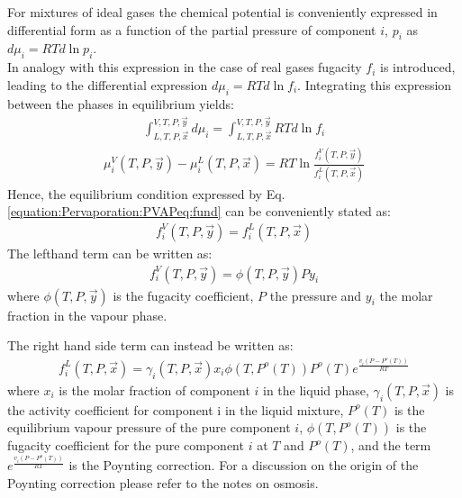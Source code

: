 \documentclass[letterpaper,10pt,english]{jupyterBook}
\begin{document}
\sphinxAtStartPar
For mixtures of ideal gases the chemical potential is conveniently expressed in differential form as a function of the partial pressure of component \(i\), \(p_i\) as \(d\mu_i=RTd\ln{p_i}\).\\
In analogy with this expression in the case of real gases fugacity \(f_i\) is introduced, leading to the differential expression \(d\mu_i=RTd\ln{f_i}\).
Integrating this expression between the phases in equilibrium yields:
\begin{equation*}
\begin{split}
\int_{L,T,P,\vec{x}}^{V,T,P,\vec{y}}d\mu_i=\int_{L,T,P,\vec{x}}^{V,T,P,\vec{y}}RTd\ln{f_i}
\end{split}
\end{equation*}\begin{equation}\label{equation:Pervaporation:PVAPeq:chempot}
\begin{split}
\mu_i^V(T,P,\vec{y})-\mu_i^L(T,P,\vec{x})=RT\ln\frac{f_i^V(T,P,\vec{y})}{f_i^L(T,P,\vec{x})}
\end{split}
\end{equation}
\sphinxAtStartPar
Hence, the equilibrium condition expressed by Eq. \eqref{equation:Pervaporation:PVAPeq:fund} can be conveniently stated as:
\begin{equation}\label{equation:Pervaporation:PVAPeq:EQUI}
\begin{split}
f_i^V(T,P,\vec{y})=f_i^L(T,P,\vec{x})
\end{split}
\end{equation}
\sphinxAtStartPar
The left\sphinxhyphen{}hand term can be written as:
\begin{equation}\label{equation:Pervaporation:PVAPeq:vapour}
\begin{split}
f_i^V(T,P,\vec{y})=\phi(T,P,\vec{y})Py_i
\end{split}
\end{equation}
\sphinxAtStartPar
where \(\phi(T,P,\vec{y})\) is the fugacity coefficient, \(P\) the pressure and \(y_i\) the molar fraction in the vapour phase.

\sphinxAtStartPar
The right hand side term can instead be written as:
\begin{equation}\label{equation:Pervaporation:PVAPeq:liquid}
\begin{split}
f_i^L(T,P,\vec{x})=\gamma_i(T,P,\vec{x})x_i\phi(T,P^o(T))P^o(T)e^{\frac{v_i(P-P^o(T))}{RT}}
\end{split}
\end{equation}
\sphinxAtStartPar
where \(x_i\) is the molar fraction of component \(i\) in the liquid phase, \(\gamma_i(T,P,\vec{x})\) is the activity coefficient for component i in the liquid mixture, \(P^o(T)\) is the equilibrium vapour pressure of the pure component \(i\), \(\phi(T,P^o(T))\) is the fugacity coefficient for the pure component \(i\) at \(T\) and \(P^o(T)\), and the term \(e^{\frac{v_i(P-P^o(T))}{RT}}\) is the Poynting correction. For a discussion on the origin of the Poynting correction please refer to the notes on osmosis.
\end{document}
